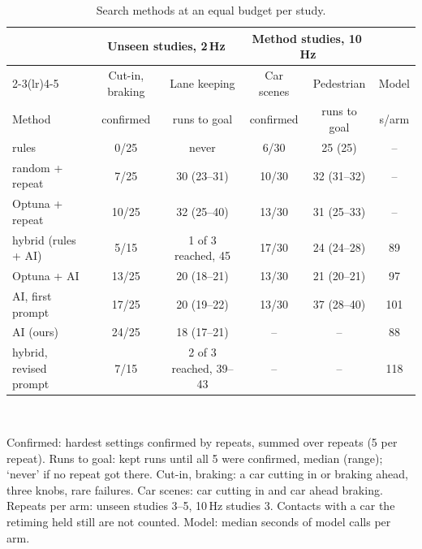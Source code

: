 \begin{table}[t]
\caption{Search methods at an equal budget per study.}
\label{tab:methods}
\centering\footnotesize
\setlength{\tabcolsep}{2.5pt}
\begin{tabular}{@{}lccccc@{}}
\toprule
 & \multicolumn{2}{c}{Unseen studies, 2\,Hz} & \multicolumn{2}{c}{Method studies, 10\,Hz} & \\
\cmidrule(lr){2-3}\cmidrule(lr){4-5}
 & Cut-in, braking & Lane keeping & Car scenes & Pedestrian & Model \\
Method & confirmed & runs to goal & confirmed & runs to goal & s/arm \\
\midrule
rules & 0/25 & never & 6/30 & 25 (25) & -- \\
random + repeat & 7/25 & 30 (23--31) & 10/30 & 32 (31--32) & -- \\
Optuna + repeat & 10/25 & 32 (25--40) & 13/30 & 31 (25--33) & -- \\
hybrid (rules + AI) & 5/15 & 1 of 3 reached, 45 & 17/30 & 24 (24--28) & 89 \\
Optuna + AI & 13/25 & 20 (18--21) & 13/30 & 21 (20--21) & 97 \\
AI, first prompt & 17/25 & 20 (19--22) & 13/30 & 37 (28--40) & 101 \\
AI (ours) & 24/25 & 18 (17--21) & -- & -- & 88 \\
hybrid, revised prompt & 7/15 & 2 of 3 reached, 39--43 & -- & -- & 118 \\
\bottomrule
\end{tabular}
\\[2pt]\parbox{\columnwidth}{\scriptsize Confirmed: hardest settings confirmed by repeats, summed over repeats (5 per repeat). Runs to goal: kept runs until all 5 were confirmed, median (range); `never' if no repeat got there. Cut-in, braking: a car cutting in or braking ahead, three knobs, rare failures. Car scenes: car cutting in and car ahead braking. Repeats per arm: unseen studies 3--5, 10\,Hz studies 3. Contacts with a car the retiming held still are not counted. Model: median seconds of model calls per arm.}
\end{table}
